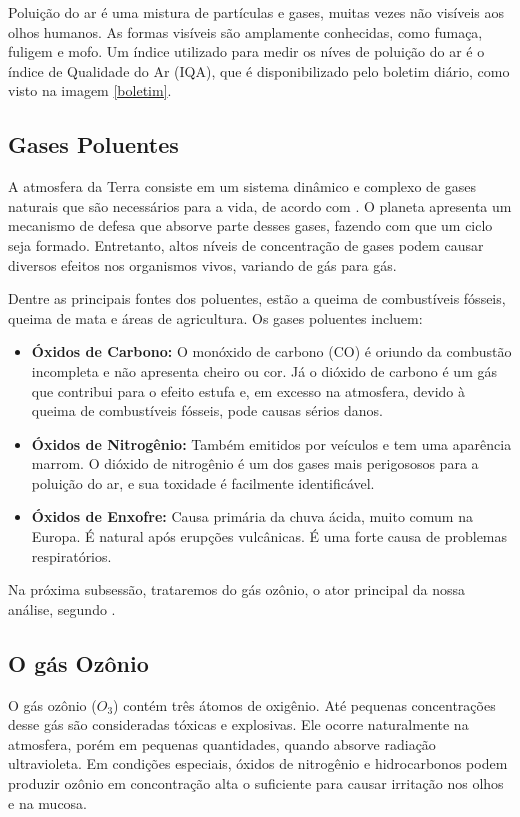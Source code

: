 Poluição do ar é uma mistura de partículas e gases, muitas vezes
não visíveis aos olhos humanos. As formas visíveis são amplamente 
conhecidas, como fumaça, fuligem e mofo. Um índice utilizado para 
medir os níves de poluição do ar é o índice de Qualidade do Ar (IQA), 
que é disponibilizado pelo boletim diário, como visto na imagem \ref{boletim}.

\subsection{Gases Poluentes}

A atmosfera da Terra consiste em um sistema dinâmico e complexo de gases
naturais que são necessários para a vida, de acordo com \cite{gases}. O
planeta apresenta um mecanismo de defesa que absorve parte desses gases,
fazendo com que um ciclo seja formado. Entretanto, altos níveis de
concentração de gases podem causar diversos efeitos nos organismos vivos,
variando de gás para gás. 

Dentre as principais fontes dos poluentes, estão a queima de combustíveis
fósseis, queima de mata e áreas de agricultura. Os gases poluentes incluem: 

\begin{itemize}
    \item \textbf{Óxidos de Carbono:} O monóxido de carbono (CO) é oriundo da
    combustão incompleta e não apresenta cheiro ou cor. Já o dióxido de
    carbono é um gás que contribui para o efeito estufa e, em excesso na
    atmosfera, devido à queima de combustíveis fósseis, pode causas sérios
    danos.  
    \item \textbf{Óxidos de Nitrogênio:} Também emitidos por veículos e
    tem uma aparência marrom. O dióxido de nitrogênio é um dos gases mais
    perigososos para a poluição do ar, e sua toxidade é facilmente
    identificável. 
    \item \textbf{Óxidos de Enxofre:} Causa primária da chuva ácida, muito
    comum na Europa. É natural após erupções vulcânicas. É uma forte causa de
    problemas respiratórios. 
\end{itemize}

Na próxima subsessão, trataremos do gás ozônio, o ator principal da nossa
análise, segundo \cite{ozone}. 

\subsection{O gás Ozônio}

O gás ozônio ($O_3$) contém três átomos de oxigênio. Até pequenas
concentrações desse gás são consideradas tóxicas e explosivas. Ele ocorre
naturalmente na atmosfera, porém em pequenas quantidades, quando absorve
radiação ultravioleta. Em condições especiais, óxidos de nitrogênio e
hidrocarbonos podem produzir ozônio em concontração alta o suficiente para
causar irritação nos olhos e na mucosa. 